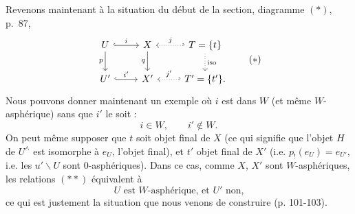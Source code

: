 Revenons maintenant à la situation du début de la section, diagramme $(*)$, p.~87,
\[
\begin{tikzcd}
U \arrow[r, hook, "i"] \arrow[d, "p"'] & X \arrow[d, "q"'] & T = \{t\} \arrow[l, hook', dotted, "j"'] \arrow[d, dotted, "\mathrm{iso}"] \\
U' \arrow[r, hook, "i'"] & X' & T' = \{t'\}. \arrow[l, hook', dotted, "j'"']
\end{tikzcd}
\tag*{$(*)$}
\]
Nous pouvons donner maintenant un exemple où $i$ est dans $W$ (et même $W$-asphérique) sans que $i'$ le soit :
\[
i \in W, \qquad i' \notin W. \tag*{$(**)$}
\]
On peut même supposer que $t$ soit objet final de $X$ (ce qui signifie que l'objet $H$ de $U^\wedge$ est isomorphe à $e_U$, l'objet final), et $t'$ objet final de $X'$ (i.e. $p_!(e_U) = e_{U'}$, i.e. les $u'\backslash U$ sont 0-asphériques). Dans ce cas, comme $X$, $X'$ sont $W$-asphériques, les relations $(**)$ équivalent à
\[
U \text{ est } W\text{-asphérique, et } U' \text{ non,} \tag*{$(***)$}
\]
ce qui est justement la situation que nous venons de construire (p. 101-103).

